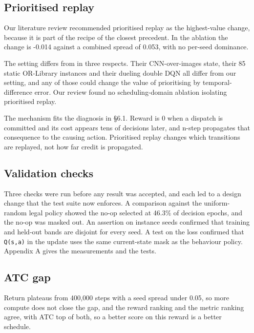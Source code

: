 \subsection{Prioritised replay}\label{prioritised-replay-did-not-help-contrary-to-our-own-prediction}

Our literature review recommended prioritised replay as the highest-value change, because it is
part of the recipe of the closest precedent. In the ablation the change is -0.014 against a combined spread of 0.053, with no per-seed
dominance.

The setting differs from \citet{hanyang2020} in three respects. Their CNN-over-images state, their 85 static
OR-Library instances and their dueling double DQN all differ from our setting, and any of those
could change the value of prioritising by temporal-difference error. Our review found no
scheduling-domain ablation isolating prioritised replay.

The mechanism fits the diagnosis in §6.1. Reward is 0 when a dispatch is committed and its cost
appears tens of decisions later, and n-step propagates that consequence to the causing action.
Prioritised replay changes which transitions are replayed, not how far credit is propagated.

\subsection{Validation checks}\label{three-faults-found-by-measuring-rather-than-assuming}

Three checks were run before any result was accepted, and each led to a design change that the
test suite now enforces. A comparison against the uniform-random legal policy showed the no-op
selected at 46.3\% of decision epochs, and the no-op was masked out. An assertion on instance
seeds confirmed that training and held-out bands are disjoint for every seed. A test on the
loss confirmed that \texttt{Q(s,a)} in the update uses the same current-state mask as the
behaviour policy. Appendix A gives the measurements and the tests.

\subsection{ATC gap}\label{why-the-agent-stops-short-of-the-best-single-rule}

Return plateaus from 400,000 steps with a seed spread under 0.05, so more compute does not close
the gap, and the reward ranking and the metric ranking agree, with ATC top of both, so a better score on this reward is a better schedule.

